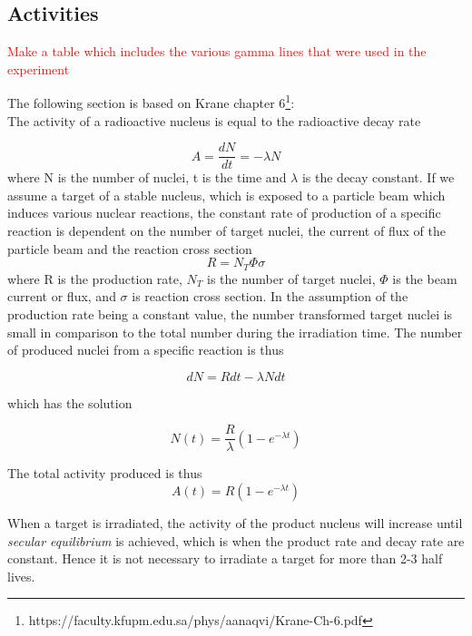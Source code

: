 \documentclass[a4paper,11pt,twoside]{book}
\begin{document}
\subsection{Activities}
\textcolor{red}{Make a table which includes the various gamma lines that were used in the experiment}

The following section is based on Krane chapter 6\footnote{https://faculty.kfupm.edu.sa/phys/aanaqvi/Krane-Ch-6.pdf}: \\

\noindent 
The activity of a radioactive nucleus is equal to the radioactive decay rate 

\begin{equation}
    A = \frac{dN}{dt} = -\lambda N
\end{equation}
\noindent where N is the number of nuclei, t is the time and $\lambda$ is the decay constant. If we assume a target of a stable nucleus, which is exposed to a particle beam which induces various nuclear reactions, the constant rate of production of a specific reaction is dependent on the number of target nuclei, the current of flux of the particle beam and the reaction cross section 
\begin{equation} \label{eq:prod_rate}
    R = N_T \Phi \sigma
\end{equation}
\noindent 
where R is the production rate, $N_T$ is the number of target nuclei, $\Phi$ is the beam current or flux, and $\sigma$ is reaction cross section. In the assumption of the production rate being a constant value, the number transformed target nuclei is small in comparison to the total number during the irradiation time. The number of produced nuclei from a specific reaction is thus 

\begin{equation}
    dN = Rdt -\lambda N dt
\end{equation}

\noindent which has the solution 

\begin{equation}
    N(t) = \frac{R}{\lambda} (1-e^{-\lambda t})
\end{equation}

\noindent The total activity produced is thus 
\begin{equation}
    A(t) = R(1-e^{-\lambda t})
\end{equation}

\noindent When a target is irradiated, the activity of the product nucleus will increase until \textit{secular equilibrium} is achieved, which is when the product rate and decay rate are constant. Hence it is not necessary to irradiate a target for more than 2-3 half lives. \\ 
\end{document}
